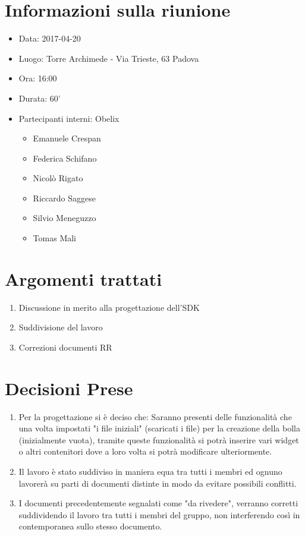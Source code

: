 \documentclass[10 pt,a4paper, openany]{article}
\date{}
\begin{document}
\section{Informazioni sulla riunione}

\begin{itemize}
\item[] Data: 2017-04-20
\item[] Luogo: Torre Archimede - Via Trieste, 63 Padova
\item[] Ora: 16:00
\item[] Durata: 60'
\item[] Partecipanti interni: Obelix
  \begin{itemize}
  \item[] Emanuele Crespan
  \item[] Federica Schifano
  \item[] Nicolò Rigato
  \item[] Riccardo Saggese
  \item[] Silvio Meneguzzo
  \item[] Tomas Mali
 \end{itemize}
\end{itemize}

\section{Argomenti trattati}
\begin{enumerate}
	\item Discussione in merito alla progettazione dell’SDK 
	\item Suddivisione del lavoro
	\item Correzioni documenti RR
\end{enumerate}

\section{Decisioni Prese}
\begin{enumerate}
	\item Per la progettazione si è deciso che:
	Saranno presenti delle funzionalità che una volta impostati "i file iniziali" (scaricati i file) per la creazione della bolla (inizialmente vuota), tramite queste funzionalità si potrà inserire vari widget o altri contenitori dove a loro volta si potrà modificare ulteriormente.

	\item Il lavoro è stato suddiviso in maniera equa tra tutti i membri ed ognuno lavorerà su parti di documenti distinte in modo da evitare possibili conflitti.	

	\item I documenti precedentemente segnalati come "da rivedere", verranno corretti suddividendo il lavoro tra tutti i membri del gruppo, non interferendo così in contemporanea sullo stesso documento.
	
	
\end{enumerate}
\end{document}

